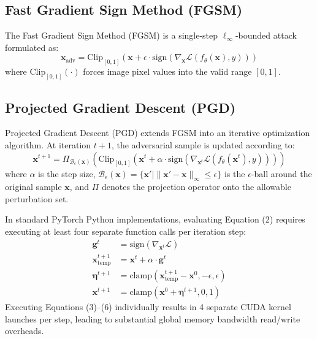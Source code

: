 \documentclass[11pt,onecolumn,a4paper]{article}
\begin{document}
\subsection{Fast Gradient Sign Method (FGSM)}
The Fast Gradient Sign Method (FGSM) \cite{goodfellow2014explaining} is a single-step $\ell_\infty$-bounded attack formulated as:
\begin{equation}
    \boldsymbol{x}_{\text{adv}} = \text{Clip}_{[0,1]} \left( \boldsymbol{x} + \epsilon \cdot \text{sign}\left( \nabla_{\boldsymbol{x}} \mathcal{L}(f_\theta(\boldsymbol{x}), y) \right) \right)
\end{equation}
where $\text{Clip}_{[0,1]}(\cdot)$ forces image pixel values into the valid range $[0, 1]$.

\subsection{Projected Gradient Descent (PGD)}
Projected Gradient Descent (PGD) \cite{madry2018towards} extends FGSM into an iterative optimization algorithm. At iteration $t + 1$, the adversarial sample is updated according to:
\begin{equation}
    \boldsymbol{x}^{t+1} = \Pi_{\mathcal{B}_\epsilon(\boldsymbol{x})} \left( \text{Clip}_{[0,1]} \left( \boldsymbol{x}^t + \alpha \cdot \text{sign}\left( \nabla_{\boldsymbol{x}^t} \mathcal{L}(f_\theta(\boldsymbol{x}^t), y) \right) \right) \right)
\end{equation}
where $\alpha$ is the step size, $\mathcal{B}_\epsilon(\boldsymbol{x}) = \{\boldsymbol{x}' \mid \|\boldsymbol{x}' - \boldsymbol{x}\|_\infty \le \epsilon\}$ is the $\epsilon$-ball around the original sample $\boldsymbol{x}$, and $\Pi$ denotes the projection operator onto the allowable perturbation set.

In standard PyTorch Python implementations, evaluating Equation (2) requires executing at least four separate function calls per iteration step:
\begin{align}
    \boldsymbol{g}^t &= \text{sign}(\nabla_{\boldsymbol{x}^t} \mathcal{L}) \\
    \boldsymbol{x}^{t+1}_{\text{temp}} &= \boldsymbol{x}^t + \alpha \cdot \boldsymbol{g}^t \\
    \boldsymbol{\eta}^{t+1} &= \text{clamp}(\boldsymbol{x}^{t+1}_{\text{temp}} - \boldsymbol{x}^0, -\epsilon, \epsilon) \\
    \boldsymbol{x}^{t+1} &= \text{clamp}(\boldsymbol{x}^0 + \boldsymbol{\eta}^{t+1}, 0, 1)
\end{align}
Executing Equations (3)--(6) individually results in 4 separate CUDA kernel launches per step, leading to substantial global memory bandwidth read/write overheads.
\end{document}
